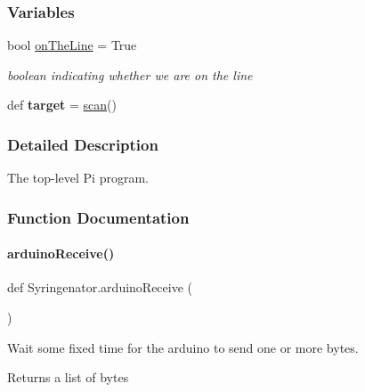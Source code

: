 \subsubsection*{Variables}
\begin{DoxyCompactItemize}
\item 
\mbox{\label{namespaceSyringenator_a161fa877b77c9ebb120c1ed20739260b}} 
bool \mbox{\hyperlink{namespaceSyringenator_a161fa877b77c9ebb120c1ed20739260b}{on\+The\+Line}} = True
\begin{DoxyCompactList}\small\item\em boolean indicating whether we are on the line \end{DoxyCompactList}\item 
\mbox{\label{namespaceSyringenator_a66c7999289f77a4adce05169661f9660}} 
def {\bfseries target} = \mbox{\hyperlink{namespaceSyringenator_aff01237d3ff3e33f0ffc32927d813df0}{scan}}()
\end{DoxyCompactItemize}


\subsubsection{Detailed Description}
The top-\/level Pi program. 

\subsubsection{Function Documentation}
\mbox{\label{namespaceSyringenator_a1c5a8cf020e400c8c0337977a5b6d921}} 
\paragraph{\texorpdfstring{arduinoReceive()}{arduinoReceive()}}
{\footnotesize\ttfamily def Syringenator.\+arduino\+Receive (\begin{DoxyParamCaption}{ }\end{DoxyParamCaption})}



Wait some fixed time for the arduino to send one or more bytes. 

\begin{DoxyReturn}{Returns}
a list of bytes 
\end{DoxyReturn}
\mbox{\label{namespaceSyringenator_ae7978d5b84170226249d8de2e204e762}} 
